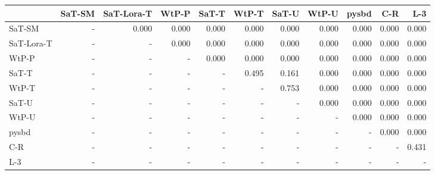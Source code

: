 \begin{tabular}{lrrrrrrrrrr}
\toprule
 & SaT-SM & SaT-Lora-T & WtP-P & SaT-T & WtP-T & SaT-U & WtP-U & pysbd & C-R & L-3 \\
\midrule
SaT-SM & - & 0.000 & 0.000 & 0.000 & 0.000 & 0.000 & 0.000 & 0.000 & 0.000 & 0.000 \\
SaT-Lora-T & - & - & 0.000 & 0.000 & 0.000 & 0.000 & 0.000 & 0.000 & 0.000 & 0.000 \\
WtP-P & - & - & - & 0.000 & 0.000 & 0.000 & 0.000 & 0.000 & 0.000 & 0.000 \\
SaT-T & - & - & - & - & 0.495 & 0.161 & 0.000 & 0.000 & 0.000 & 0.000 \\
WtP-T & - & - & - & - & - & 0.753 & 0.000 & 0.000 & 0.000 & 0.000 \\
SaT-U & - & - & - & - & - & - & 0.000 & 0.000 & 0.000 & 0.000 \\
WtP-U & - & - & - & - & - & - & - & 0.000 & 0.000 & 0.000 \\
pysbd & - & - & - & - & - & - & - & - & 0.000 & 0.000 \\
C-R & - & - & - & - & - & - & - & - & - & 0.431 \\
L-3 & - & - & - & - & - & - & - & - & - & - \\
\bottomrule
\end{tabular}

